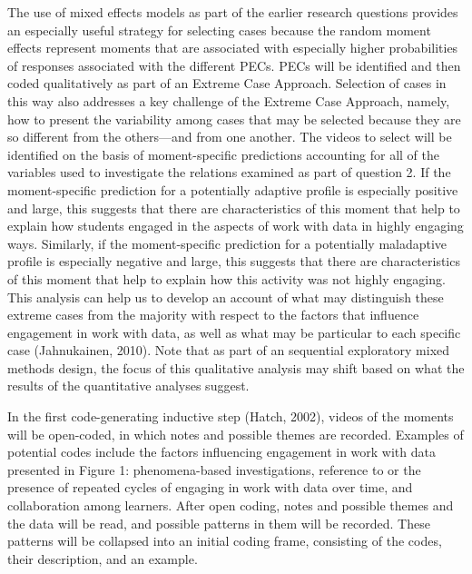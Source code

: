 \documentclass[]{book}
\theoremstyle{definition}
\theoremstyle{definition}
\theoremstyle{definition}
\theoremstyle{remark}
\begin{document}
The use of mixed effects models as part of the earlier research
questions provides an especially useful strategy for selecting cases
because the random moment effects represent moments that are associated
with especially higher probabilities of responses associated with the
different PECs. PECs will be identified and then coded qualitatively as
part of an Extreme Case Approach. Selection of cases in this way also
addresses a key challenge of the Extreme Case Approach, namely, how to
present the variability among cases that may be selected because they
are so different from the others---and from one another. The videos to
select will be identified on the basis of moment-specific predictions
accounting for all of the variables used to investigate the relations
examined as part of question 2. If the moment-specific prediction for a
potentially adaptive profile is especially positive and large, this
suggests that there are characteristics of this moment that help to
explain how students engaged in the aspects of work with data in highly
engaging ways. Similarly, if the moment-specific prediction for a
potentially maladaptive profile is especially negative and large, this
suggests that there are characteristics of this moment that help to
explain how this activity was not highly engaging. This analysis can
help us to develop an account of what may distinguish these extreme
cases from the majority with respect to the factors that influence
engagement in work with data, as well as what may be particular to each
specific case (Jahnukainen, 2010). Note that as part of an sequential
exploratory mixed methods design, the focus of this qualitative analysis
may shift based on what the results of the quantitative analyses
suggest.

In the first code-generating inductive step (Hatch, 2002), videos of the
moments will be open-coded, in which notes and possible themes are
recorded. Examples of potential codes include the factors influencing
engagement in work with data presented in Figure 1: phenomena-based
investigations, reference to or the presence of repeated cycles of
engaging in work with data over time, and collaboration among learners.
After open coding, notes and possible themes and the data will be read,
and possible patterns in them will be recorded. These patterns will be
collapsed into an initial coding frame, consisting of the codes, their
description, and an example.
\end{document}

